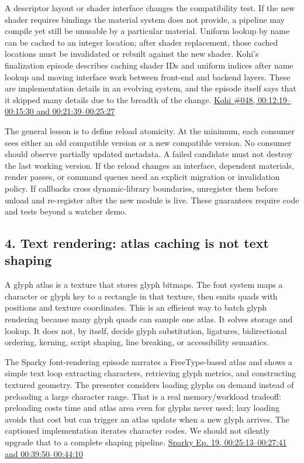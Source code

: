 A descriptor layout or shader interface changes the compatibility test. If the new shader requires bindings the material system does not provide, a pipeline may compile yet still be unusable by a particular material. Uniform lookup by name can be cached to an integer location; after shader replacement, those cached locations must be invalidated or rebuilt against the new shader. Kohi's finalization episode describes caching shader IDs and uniform indices after name lookup and moving interface work between front-end and backend layers. These are implementation details in an evolving system, and the episode itself says that it skipped many details due to the breadth of the change. \href{https://www.youtube.com/watch?v=9nP3aBsrCXs&t=12m19s}{Kohi \#048, 00:12:19--00:15:30 and 00:21:39--00:25:27}

The general lesson is to define reload atomicity. At the minimum, each consumer sees either an old compatible version or a new compatible version. No consumer should observe partially updated metadata. A failed candidate must not destroy the last working version. If the reload changes an interface, dependent materials, render passes, or command queues need an explicit migration or invalidation policy. If callbacks cross dynamic-library boundaries, unregister them before unload and re-register after the new module is live. These guarantees require code and tests beyond a watcher demo.

\subsection{4. Text rendering: atlas caching is not text shaping}\label{06-engine-ii-ch041-text-rendering-atlas-caching-is-not-text-shaping}

\hypertarget{06-engine-ii-ch041-text-rendering-atlas-caching-is-not-text-shaping}{}

A glyph atlas is a texture that stores glyph bitmaps. The font system maps a character or glyph key to a rectangle in that texture, then emits quads with positions and texture coordinates. This is an efficient way to batch glyph rendering because many glyph quads can sample one atlas. It solves storage and lookup. It does not, by itself, decide glyph substitution, ligatures, bidirectional ordering, kerning, script shaping, line breaking, or accessibility semantics.

The Sparky font-rendering episode narrates a FreeType-based atlas and shows a simple text loop extracting characters, retrieving glyph metrics, and constructing textured geometry. The presenter considers loading glyphs on demand instead of preloading a large character range. That is a real memory/workload tradeoff: preloading costs time and atlas area even for glyphs never used; lazy loading avoids that cost but can trigger an atlas update when a new glyph arrives. The captioned implementation iterates character codes. We should not silently upgrade that to a complete shaping pipeline. \href{https://www.youtube.com/watch?v=Rsdc6I80aFQ&t=25m13s}{Sparky Ep. 19, 00:25:13--00:27:41 and 00:39:50--00:44:10}


